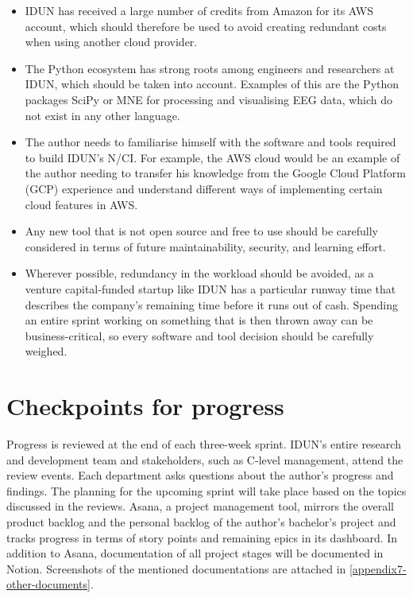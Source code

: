 \begin{itemize}
  \item IDUN has received a large number of credits from Amazon for its AWS account, which should therefore be used to avoid creating redundant costs when using another cloud provider.
  \item The Python ecosystem has strong roots among engineers and researchers at IDUN, which should be taken into account. Examples of this are the Python packages SciPy or MNE for processing and visualising EEG data, which do not exist in any other language.
  \item The author needs to familiarise himself with the software and tools required to build IDUN’s N/CI. For example, the AWS cloud would be an example of the author needing to transfer his knowledge from the Google Cloud Platform (GCP) experience and understand different ways of implementing certain cloud features in AWS.
  \item Any new tool that is not open source and free to use should be carefully considered in terms of future maintainability, security, and learning effort.
  \item Wherever possible, redundancy in the workload should be avoided, as a venture capital-funded startup like IDUN has a particular runway time that describes the company’s remaining time before it runs out of cash. Spending an entire sprint working on something that is then thrown away can be business-critical, so every software and tool decision should be carefully weighed.
\end{itemize}

\section{Checkpoints for progress}
\label{chapter3-checkpoints-for-progress}

Progress is reviewed at the end of each three-week sprint. IDUN’s entire research and development team and stakeholders, such as C-level management, attend the review events. Each department asks questions about the author’s progress and findings. The planning for the upcoming sprint will take place based on the topics discussed in the reviews. Asana, a project management tool, mirrors the overall product backlog and the personal backlog of the author’s bachelor’s project and tracks progress in terms of story points and remaining epics in its dashboard. In addition to Asana, documentation of all project stages will be documented in Notion. Screenshots of the mentioned documentations are attached in \autoref{appendix7-other-documents}.

